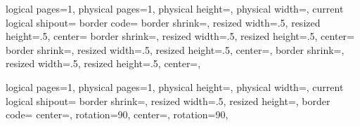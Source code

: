 {%
  \edef\pgfpageoptionheight{\the\paperheight}
  \edef\pgfpageoptionwidth{\the\paperwidth}
  \def\pgfpageoptionborder{0pt}
  \def\pgfpageoptionfirstshipout{1}
  \def\pgfpageoptionbordercode{}
}%
{%
  \pgfpagesphysicalpageoptions
  {%
    logical pages=1,%
    physical pages=1,%
    physical height=\pgfpageoptionheight,%
    physical width=\pgfpageoptionwidth,%
    current logical shipout=\pgfpageoptionfirstshipout%
  }
  \pgfpagessetdefaults
  {%
    border code=\pgfpageoptionbordercode
  }
    {%
      border shrink=\pgfpageoptionborder,%
      resized width=.5\pgfphysicalwidth,%
      resized height=.5\pgfphysicalheight,%
      center=\pgfpoint{.25\pgfphysicalwidth}{.75\pgfphysicalheight}%
    }%
    {%
      border shrink=\pgfpageoptionborder,%
      resized width=.5\pgfphysicalwidth,%
      resized height=.5\pgfphysicalheight,%
      center=\pgfpoint{.75\pgfphysicalwidth}{.75\pgfphysicalheight}%
    }%
    {%
      border shrink=\pgfpageoptionborder,%
      resized width=.5\pgfphysicalwidth,%
      resized height=.5\pgfphysicalheight,%
      center=\pgfpoint{.25\pgfphysicalwidth}{.25\pgfphysicalheight},%
    }%
    {%
      border shrink=\pgfpageoptionborder,%
      resized width=.5\pgfphysicalwidth,%
      resized height=.5\pgfphysicalheight,%
      center=\pgfpoint{.75\pgfphysicalwidth}{.25\pgfphysicalheight},%
    }%
}

%
{%
  \edef\pgfpageoptionheight{\the\paperheight}
  \edef\pgfpageoptionwidth{\the\paperwidth}
  \def\pgfpageoptionborder{0pt}
  \def\pgfpageoptionfirstshipout{1}
  \def\pgfpageoptionbordercode{}
}%
{%
  \pgfpagesphysicalpageoptions
  {%
    logical pages=1,%
    physical pages=1,%
    physical height=\pgfpageoptionheight,%
    physical width=\pgfpageoptionwidth,%
    current logical shipout=\pgfpageoptionfirstshipout%
  }
  \pgfpagessetdefaults
  {%
    border shrink=\pgfpageoptionborder,%
    resized width=.5\pgfphysicalheight,%
    resized height=\pgfphysicalwidth,%
    border code=\pgfpageoptionbordercode
  }
  {%
    center=\pgfpoint{.5\pgfphysicalwidth}{.75\pgfphysicalheight},%
    rotation=90,%
  }
  {%
    center=\pgfpoint{.5\pgfphysicalwidth}{.25\pgfphysicalheight},%
    rotation=90,%
  }
}


